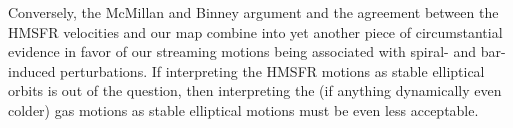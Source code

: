 Conversely, the McMillan and Binney argument and the agreement between the HMSFR velocities and our map combine into yet another piece of circumstantial evidence in favor of our streaming motions being associated with spiral- and bar-induced perturbations. 
If interpreting the HMSFR motions as stable elliptical orbits is out of the question, then interpreting the (if anything dynamically even colder) gas motions as stable elliptical motions must be even less acceptable.
